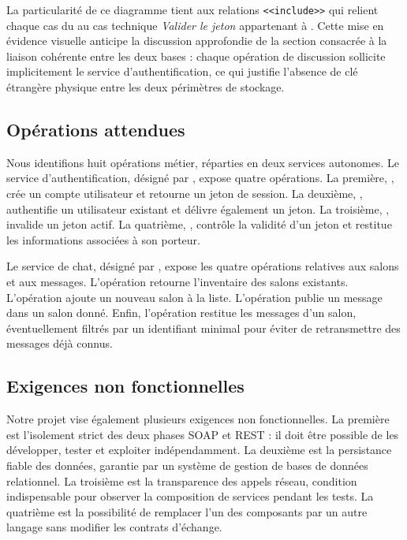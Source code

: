 La particularité de ce diagramme tient aux relations \texttt{<<include>>} qui relient chaque cas du  au cas technique \emph{Valider le jeton} appartenant à . Cette mise en évidence visuelle anticipe la discussion approfondie de la section consacrée à la liaison cohérente entre les deux bases : chaque opération de discussion sollicite implicitement le service d'authentification, ce qui justifie l'absence de clé étrangère physique entre les deux périmètres de stockage.

\subsection{Opérations attendues}

Nous identifions huit opérations métier, réparties en deux services autonomes. Le service d'authentification, désigné par , expose quatre opérations. La première, , crée un compte utilisateur et retourne un jeton de session. La deuxième, , authentifie un utilisateur existant et délivre également un jeton. La troisième, , invalide un jeton actif. La quatrième, , contrôle la validité d'un jeton et restitue les informations associées à son porteur.

Le service de chat, désigné par , expose les quatre opérations relatives aux salons et aux messages. L'opération  retourne l'inventaire des salons existants. L'opération  ajoute un nouveau salon à la liste. L'opération  publie un message dans un salon donné. Enfin, l'opération  restitue les messages d'un salon, éventuellement filtrés par un identifiant minimal pour éviter de retransmettre des messages déjà connus.

\subsection{Exigences non fonctionnelles}

Notre projet vise également plusieurs exigences non fonctionnelles. La première est l'isolement strict des deux phases SOAP et REST : il doit être possible de les développer, tester et exploiter indépendamment. La deuxième est la persistance fiable des données, garantie par un système de gestion de bases de données relationnel. La troisième est la transparence des appels réseau, condition indispensable pour observer la composition de services pendant les tests. La quatrième est la possibilité de remplacer l'un des composants par un autre langage sans modifier les contrats d'échange.

